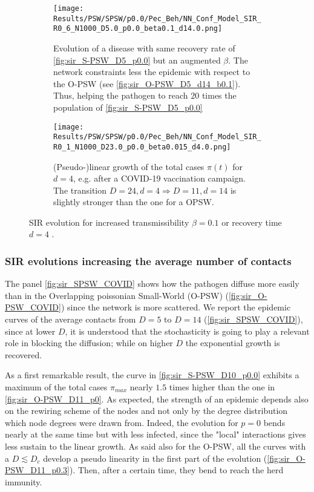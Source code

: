 \documentclass[a4paper,10pt,twoside]{book} %
\theoremstyle{definition}
\begin{document}
\clearpage
\begin{figure}[H]
	\centering
	\begin{subfigure}{0.8\linewidth}
		\texttt{[image: Results/PSW/SPSW/p0.0/Pec\_Beh/NN\_Conf\_Model\_SIR\_R0\_6\_N1000\_D5.0\_p0.0\_beta0.1\_d14.0.png]}
		\caption{Evolution of a disease with same recovery rate of \autoref{fig:sir_S-PSW_D5_p0.0} but an augmented $\beta$. The network constraints less the epidemic with respect to the O-PSW (see \autoref{fig:sir_O-PSW_D5_d14_b0.1}). Thus, helping the pathogen to reach $ 20$ times the population of \autoref{fig:sir_S-PSW_D5_p0.0}}
		\label{fig:SPSW_D5_b0.1_d14}
	\end{subfigure}
	\par\medskip
	\begin{subfigure}{0.8\linewidth}
		\texttt{[image: Results/PSW/SPSW/p0.0/Pec\_Beh/NN\_Conf\_Model\_SIR\_R0\_1\_N1000\_D23.0\_p0.0\_beta0.015\_d4.0.png]}
		\caption{(Pseudo-)linear growth of the total cases $\pi(t)$ for $d = 4$, e.g. after a COVID-19 vaccination campaign. The transition $D = 24, d = 4 \Rightarrow D = 11, d = 14 $ is slightly stronger than the one for a OPSW.}
		\label{fig:sir_SPSW_D23_beta0.015_d4}
	\end{subfigure}
	\caption{SIR evolution for increased transmissibility $ \beta = 0.1$ or recovery time $ d = 4$ .}
\end{figure}

\clearpage
\subsubsection{SIR evolutions increasing the average number of contacts}
The panel \autoref{fig:sir_SPSW_COVID} shows how the pathogen diffuse more easily than in the Overlapping poissonian Small-World (O-PSW) (\autoref{fig:sir_O-PSW_COVID}) since the network is more scattered. We report the epidemic curves of the average contacts from $D = 5$ to $D = 14$ (\autoref{fig:sir_SPSW_COVID}), since at lower $D$, it is understood that the stochasticity is going to play a relevant role in blocking the diffusion; while on higher $D$ the exponential growth is recovered.

As a first remarkable result, the curve in \autoref{fig:sir_S-PSW_D10_p0.0} exhibits a maximum of the total cases $ \pi_{max}$ nearly $1.5$ times higher than the one in \autoref{fig:sir_O-PSW_D11_p0}. As expected, the strength of an epidemic depends also on the rewiring scheme of the nodes and not only by the degree distribution which node degrees were drawn from. Indeed, the evolution for $ p = 0$  bends nearly at the same time but with less infected, since the "local" interactions gives less sustain to the linear growth. As said also for the O-PSW, all the curves with a $D \lesssim D_c$ develop a pseudo linearity in the first part of the evolution (\autoref{fig:sir_O-PSW_D11_p0.3}). Then, after a certain time, they bend to reach the herd immunity.
\end{document}
